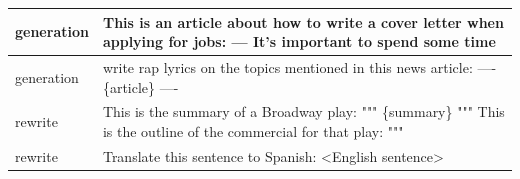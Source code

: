 \documentclass{article}
\begin{document}
\begin{longtable}{p{} p{}}
    generation &                                                                                                                                                                                                                                                                                                       This is an article about how to write a cover letter when applying for jobs:{\newline} ---{\newline} It's important to spend some time \\ \midrule
    generation &                                                                                                                                                                                                                                                                                                                                write rap lyrics on the topics mentioned in this news article:{\newline} {\newline}{\newline} ----{\newline} \{article\}{\newline} ---- \\ \midrule
       rewrite &                                                                                                                                                                                                                                                                                                 This is the summary of a Broadway play:{\newline} """{\newline} \{summary\}{\newline} """{\newline} This is the outline of the commercial for that play:{\newline} """ \\ \midrule
       rewrite &                                                                                                                                                                                                                                                                                                                                                                Translate this sentence to Spanish:{\newline} {\newline}{\newline} <English sentence> \\ \midrule

\end{longtable}
\end{document}
